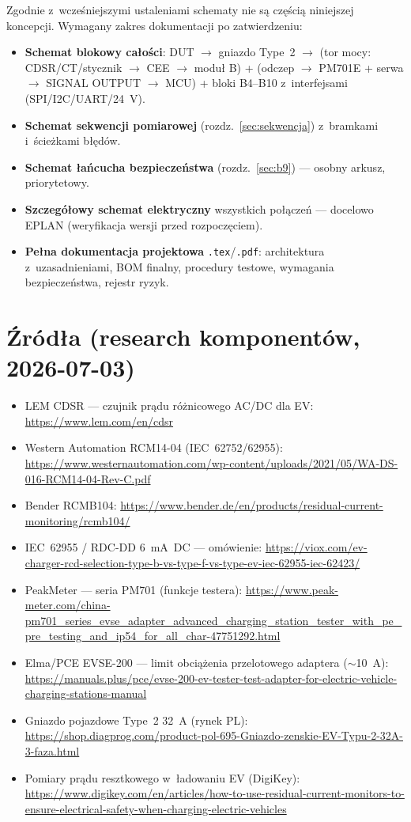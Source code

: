 \documentclass[11pt,a4paper]{article}
\begin{document}
Zgodnie z~wcześniejszymi ustaleniami schematy nie są częścią niniejszej koncepcji. Wymagany zakres dokumentacji po zatwierdzeniu:
\begin{itemize}
\item \textbf{Schemat blokowy całości}: DUT $\rightarrow$ gniazdo Type~2 $\rightarrow$ (tor mocy: CDSR/CT/stycznik $\rightarrow$ CEE $\rightarrow$ moduł B) + (odczep $\rightarrow$ PM701E + serwa $\rightarrow$ SIGNAL OUTPUT $\rightarrow$ MCU) + bloki B4--B10 z~interfejsami (SPI/I2C/UART/24~V).
\item \textbf{Schemat sekwencji pomiarowej} (rozdz.~\ref{sec:sekwencja}) z~bramkami i~ścieżkami błędów.
\item \textbf{Schemat łańcucha bezpieczeństwa} (rozdz.~\ref{sec:b9}) --- osobny arkusz, priorytetowy.
\item \textbf{Szczegółowy schemat elektryczny} wszystkich połączeń --- docelowo EPLAN (weryfikacja wersji przed rozpoczęciem).
\item \textbf{Pełna dokumentacja projektowa} \texttt{.tex}/\texttt{.pdf}: architektura z~uzasadnieniami, BOM finalny, procedury testowe, wymagania bezpieczeństwa, rejestr ryzyk.
\end{itemize}

\section{Źródła (research komponentów, 2026-07-03)}

\begin{itemize}\small
\item LEM CDSR --- czujnik prądu różnicowego AC/DC dla EV: \url{https://www.lem.com/en/cdsr}
\item Western Automation RCM14-04 (IEC~62752/62955): \url{https://www.westernautomation.com/wp-content/uploads/2021/05/WA-DS-016-RCM14-04-Rev-C.pdf}
\item Bender RCMB104: \url{https://www.bender.de/en/products/residual-current-monitoring/rcmb104/}
\item IEC~62955 / RDC-DD 6~mA~DC --- omówienie: \url{https://viox.com/ev-charger-rcd-selection-type-b-vs-type-f-vs-type-ev-iec-62955-iec-62423/}
\item PeakMeter --- seria PM701 (funkcje testera): \url{https://www.peak-meter.com/china-pm701_series_evse_adapter_advanced_charging_station_tester_with_pe_pre_testing_and_ip54_for_all_char-47751292.html}
\item Elma/PCE EVSE-200 --- limit obciążenia przelotowego adaptera ($\sim$10~A): \url{https://manuals.plus/pce/evse-200-ev-tester-test-adapter-for-electric-vehicle-charging-stations-manual}
\item Gniazdo pojazdowe Type~2 32~A (rynek PL): \url{https://shop.diagprog.com/product-pol-695-Gniazdo-zenskie-EV-Typu-2-32A-3-faza.html}
\item Pomiary prądu resztkowego w~ładowaniu EV (DigiKey): \url{https://www.digikey.com/en/articles/how-to-use-residual-current-monitors-to-ensure-electrical-safety-when-charging-electric-vehicles}
\end{itemize}
\end{document}
